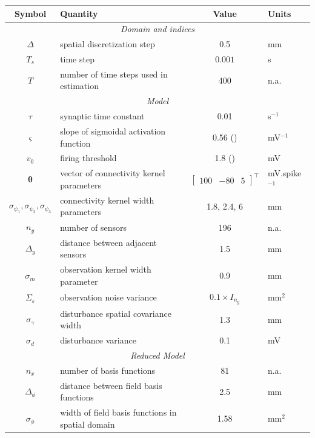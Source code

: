 \documentclass[5p,authoryear]{elsarticle}
\begin{document}
\begin{table}[!ht]
\begin{tabular}{|c|l|c|l|}
	\hline
	\textbf{Symbol} & \textbf{Quantity} & \textbf{Value} & \textbf{Units}\\
	\hline
	\multicolumn{4}{|c|}{\emph{Domain and indices}}\\
	\hline
	$\Delta$ & spatial discretization step & 0.5 & mm \\
	$T_s$ & time step & $0.001$ & s\\
	$T$ & number of time steps used in estimation & 400 & n.a.\\
	\hline 
\multicolumn{4}{|c|}{\emph{Model}}\\
	\hline
	$\tau$ & synaptic time constant & 0.01 & s$^{-1}$ \\
	$\varsigma$ & slope of sigmoidal activation function & 0.56 (\cite{Wendling2005}) & mV$^{-1}$\\
	$v_0$ & firing threshold & 1.8 (\cite{Marreiros2008}) & mV  \\
	$\boldsymbol{\theta}$ & vector of connectivity kernel parameters & $\left[\begin{array}{ccc}
	100 &-80 &5
	\end{array}
	\right]^{\top}$ & mV.spike$^{-1}$\\
	$\sigma_{\psi_{1}}, \sigma_{\psi_{2}}, \sigma_{\psi_{3}}$ & connectivity kernel width parameters & 1.8, 2.4, 6 & mm\\
	$n_y$ & number of sensors & 196 & n.a.\\ 
	$\Delta_y$ & distance between adjacent sensors & 1.5 & mm\\
	$\sigma_{m}$ & observation kernel width parameter & 0.9 & mm \\
	$\Sigma_{\varepsilon}$ & observation noise variance & $0.1 \times I_{n_y}$ & mm$^2$ \\
	$\sigma_{\gamma}$& disturbance spatial covariance width & 1.3 & mm\\
	$\sigma_{d}$ & disturbance variance & 0.1 & mV \\
	\hline 
	\multicolumn{4}{|c|}{\emph{Reduced Model}}\\
	\hline
	$n_x$ & number of basis functions& 81 & n.a.\\
	$\Delta_{\phi}$ & distance between field basis functions & 2.5 & mm \\
	$\sigma_{\phi}$ & width of field basis functions in spatial domain & 1.58 & mm$^2$\\

\end{tabular}
\end{table}
\end{document}
